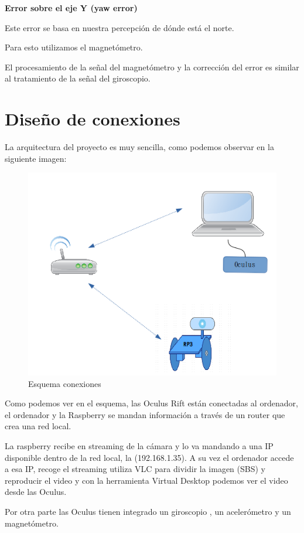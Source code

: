 \documentclass[twoside, 12pt]{epstfg}
\begin{document}
\newpage
\textbf{Error sobre el eje Y (yaw error)}

Este error se basa en nuestra percepción de dónde está el norte.

Para esto utilizamos el magnetómetro.

El procesamiento de la señal del magnetómetro y la corrección del error es similar al tratamiento de la señal del giroscopio.

\section{Diseño de conexiones}

La arquitectura del proyecto es muy sencilla, como podemos observar en la siguiente imagen:

\begin{figure}[h]
	\centerline{
		\mbox{\includegraphics[width=.80\textwidth]{images/EsquemaConexiones.png}}
	}
	\caption{Esquema conexiones}
\end{figure}


Como podemos ver en el esquema, las Oculus Rift están conectadas al ordenador, el ordenador y la Raspberry se mandan información a través de un router que crea una red local.

La raspberry recibe en streaming de la cámara y lo va mandando a una IP disponible dentro de la red local, la (192.168.1.35). A su vez el ordenador accede a esa IP, recoge el streaming utiliza VLC para dividir la imagen (SBS) y reproducir el video y con la herramienta Virtual Desktop podemos ver el video desde las Oculus.

Por otra parte las Oculus tienen integrado un giroscopio , un acelerómetro y un magnetómetro.
\end{document}
